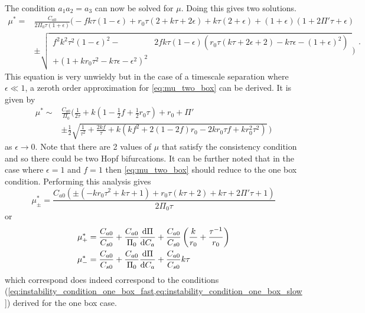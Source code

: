 The condition $a_1a_2=a_3$  can now be solved for $\mu$. Doing this gives two solutions.
\begin{equation}
  \label{eq:mu_two_box}
  \begin{split}
  \mu^* = &\frac{C_{a0}}{2 \Pi_0 \tau  (1+\epsilon)}
  \Biggl(
  -f k \tau  (1-\epsilon)+r_0 \tau  (2 + k \tau +2 \epsilon)+k \tau  (2+\epsilon)+(1+\epsilon) (1+2 \Pi' \tau +\epsilon)\\
  &\pm\sqrt{
    \begin{split}
    f^2 k^2 \tau ^2 (1-\epsilon)^2-&2 f k \tau  (1-\epsilon) \left(r_0 \tau  (k \tau +2 \epsilon +2)-k \tau  \epsilon -(1+\epsilon)^2\right)\\+
    \left(1+k r_0 \tau ^2-k \tau  \epsilon -\epsilon ^2\right)^2
  \end{split}}
  \Biggr)
  \end{split}.
\end{equation}
This equation is very unwieldy but in the case of a timescale separation where $\epsilon \ll 1$, a zeroth order approximation for \cref{eq:mu_two_box} can be derived. It is given by
\begin{equation}
  \label{eq:mu_two_box_zero_eps}
  \begin{split}
  \mu^* \sim &\frac{C_{a0}}{\Pi_0}\Biggl(
    \frac{1}{2\tau} + k(1 - \frac{1}{2}f + \frac{1}{2}r_0 \tau) + r_0 + \Pi'\\
    &\pm\frac{1}{2}\sqrt{\frac{1}{\tau^2} + \frac{2kf}{\tau} + k(kf^2 + 2 (1 - 2f)r_0  - 2 k r_0\tau f  + k r_0^2 \tau^2)}\,\Biggr)
\end{split}
\end{equation}
as $\epsilon \rightarrow 0$.
Note that there are 2 values of $\mu$ that satisfy the consistency condition and so there could be two Hopf bifurcations. It can be further noted that
in the case where $\epsilon = 1$ and $f=1$ then \cref{eq:mu_two_box} should reduce to the one box condition.
Performing this analysis gives
\begin{equation}
  \label{eq:mu_zero_one}
  \mu^*_{\pm} = \frac{C_{a0} \left(\pm\left(-k r_0 \tau ^2+k \tau +1\right)+r_0 \tau  (k \tau +2)+k \tau +2 \Pi' \tau +1\right)}{2 \Pi_0 \tau}
\end{equation}
or
\begin{align}
  \label{eq:mu_zero_one_cases}
  \mu_+^* &= \frac{C_{a0}}{C_{s0}} + \frac{C_{a0}}{\Pi_0}\dv{\Pi}{C_a} + \frac{C_{a0}}{C_{s0}} \left(\frac{k}{r_0} + \frac{\tau^{-1}}{r_0}\right) \\
  \mu_-^* &= \frac{C_{a0}}{C_{s0}} + \frac{C_{a0}}{\Pi_0}\dv{\Pi}{C_a} + \frac{C_{a0}}{C_{s0}}k\tau 
\end{align}
which correspond does indeed correspond to the conditions (\cref{eq:instability_condition_one_box_fast,eq:instability_condition_one_box_slow}) derived for the one box case.

